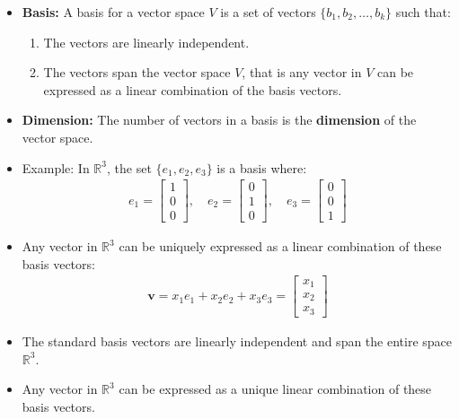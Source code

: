 \begin{frame}
    \begin{itemize}
        \item \textbf{Basis:} A basis for a vector space $V$ is a set of vectors $\{b_1, b_2, \ldots, b_k\}$ such that:
        \begin{enumerate}
            \item The vectors are linearly independent.
            \item The vectors span the vector space $V$, that is  any vector in $V$ can be expressed as a linear combination of the basis vectors.
        \end{enumerate}
        \item \textbf{Dimension:} The number of vectors in a basis is the \textbf{dimension} of the vector space.
        \item Example: In $\mathbb{R}^3$, the set $\{e_1, e_2, e_3\}$ is a basis where:
            \begin{align}
                e_1 = \begin{bmatrix} 1 \\ 0 \\ 0 \end{bmatrix}, \quad
                e_2 = \begin{bmatrix} 0 \\ 1 \\ 0 \end{bmatrix}, \quad      
                e_3 = \begin{bmatrix} 0 \\ 0 \\ 1 \end{bmatrix}
            \end{align}
        \item Any vector in $\mathbb{R}^3$ can be uniquely expressed as a linear combination of these basis vectors:
            \begin{align}
                \mathbf{v} = x_1 e_1 + x_2 e_2 + x_3 e_3 = \begin{bmatrix} x_1 \\ x_2 \\ x_3 \end{bmatrix}
            \end{align} 
    \item The standard basis vectors are linearly independent and span the entire space $\mathbb{R}^3$. 
    \item Any vector in $\mathbb{R}^3$ can be expressed as a unique linear combination of these basis vectors.
    \end{itemize}
\end{frame}
